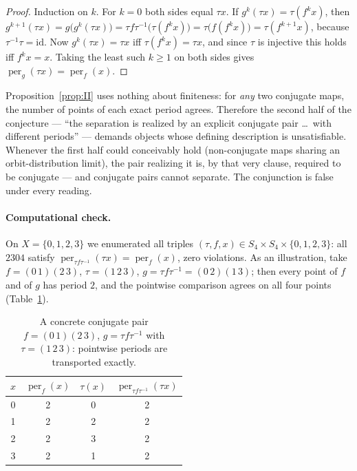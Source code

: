 \documentclass[11pt]{article}
\theoremstyle{definition}
\newcommand{\id}{\mathrm{id}}
\begin{document}
\begin{proof}
Induction on $k$. For $k=0$ both sides equal $\tau x$. If
$g^k(\tau x)=\tau(f^kx)$, then
$g^{k+1}(\tau x)=g\bigl(g^k(\tau x)\bigr)=\tau f\tau^{-1}\bigl(\tau(f^kx)\bigr)
=\tau\bigl(f(f^kx)\bigr)=\tau(f^{k+1}x)$,
because $\tau^{-1}\tau=\id$. Now $g^k(\tau x)=\tau x$ iff $\tau(f^kx)=\tau x$,
and since $\tau$ is injective this holds iff $f^kx=x$. Taking the least such
$k\ge1$ on both sides gives $\operatorname{per}_g(\tau x)=\operatorname{per}_f(x)$.
\end{proof}

Proposition~\ref{prop:II} uses nothing about finiteness: for \emph{any} two
conjugate maps, the number of points of each exact period agrees. Therefore the
second half of the conjecture --- ``the separation is realized by an explicit
conjugate pair \dots\ with different periods'' --- demands objects whose defining
description is unsatisfiable. Whenever the first half could conceivably hold
(non-conjugate maps sharing an orbit-distribution limit), the pair realizing it
is, by that very clause, required to be conjugate --- and conjugate pairs cannot
separate. The conjunction is false under every reading.

\paragraph{Computational check.}
On $X=\{0,1,2,3\}$ we enumerated all triples
$(\tau,f,x)\in S_4\times S_4\times\{0,1,2,3\}$: all $2304$ satisfy
$\operatorname{per}_{\tau f\tau^{-1}}(\tau x)=\operatorname{per}_f(x)$, zero
violations. As an illustration, take $f=(0\,1)(2\,3)$, $\tau=(1\,2\,3)$,
$g=\tau f\tau^{-1}=(0\,2)(1\,3)$; then every point of $f$ and of $g$ has period
$2$, and the pointwise comparison agrees on all four points
(Table~\ref{tab:pair}).

\begin{table}[ht]
\centering
\begin{tabular}{cccc}
\toprule
$x$ & $\operatorname{per}_f(x)$ & $\tau(x)$ &
$\operatorname{per}_{\tau f\tau^{-1}}(\tau x)$\\
\midrule
0 & 2 & 0 & 2\\
1 & 2 & 2 & 2\\
2 & 2 & 3 & 2\\
3 & 2 & 1 & 2\\
\bottomrule
\end{tabular}
\caption{A concrete conjugate pair $f=(0\,1)(2\,3)$, $g=\tau f\tau^{-1}$ with
$\tau=(1\,2\,3)$: pointwise periods are transported exactly.}
\label{tab:pair}
\end{table}
\end{document}
